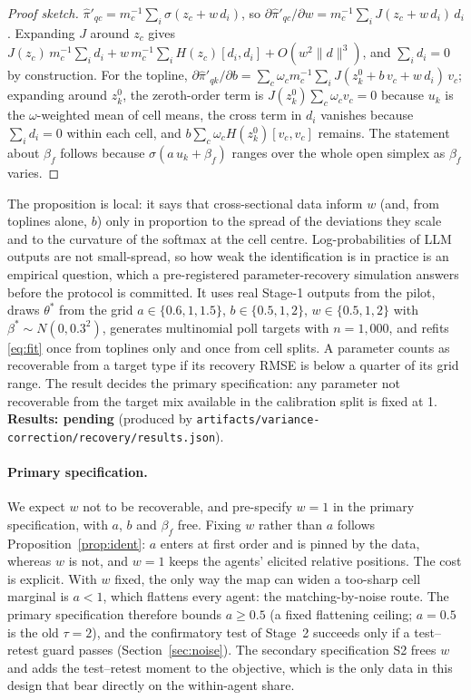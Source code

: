 \documentclass[11pt]{article}
\newcommand{\pending}[1]{\textbf{Results: pending} (produced by \nolinkurl{#1}).}
\begin{document}
\begin{proof}[Proof sketch]
$\hat\pi'_{qc}=m_c^{-1}\sum_i\sigma(z_c+w\,d_i)$, so $\partial\hat\pi'_{qc}/\partial w = m_c^{-1}\sum_i J(z_c+w\,d_i)\,d_i$. Expanding $J$ around $z_c$ gives $J(z_c)\,m_c^{-1}\sum_i d_i + w\,m_c^{-1}\sum_i H(z_c)[d_i,d_i]+O(w^2\lVert d\rVert^3)$, and $\sum_i d_i=0$ by construction. For the topline, $\partial\hat\pi'_{qk}/\partial b=\sum_c\omega_c m_c^{-1}\sum_i J(z^0_k+b\,v_c+w\,d_i)\,v_c$; expanding around $z^0_k$, the zeroth-order term is $J(z^0_k)\sum_c\omega_c v_c=0$ because $u_k$ is the $\omega$-weighted mean of cell means, the cross term in $d_i$ vanishes because $\sum_i d_i=0$ within each cell, and $b\sum_c\omega_c H(z^0_k)[v_c,v_c]$ remains. The statement about $\beta_f$ follows because $\sigma(a\,u_k+\beta_f)$ ranges over the whole open simplex as $\beta_f$ varies.
\end{proof}

The proposition is local: it says that cross-sectional data inform $w$ (and, from toplines alone, $b$) only in proportion to the spread of the deviations they scale and to the curvature of the softmax at the cell centre. Log-probabilities of LLM outputs are not small-spread, so how weak the identification is in practice is an empirical question, which a pre-registered parameter-recovery simulation answers before the protocol is committed. It uses real Stage-1 outputs from the pilot, draws $\theta^\ast$ from the grid $a\in\{0.6,1,1.5\}$, $b\in\{0.5,1,2\}$, $w\in\{0.5,1,2\}$ with $\beta^\ast\sim N(0,0.3^2)$, generates multinomial poll targets with $n=1{,}000$, and refits \eqref{eq:fit} once from toplines only and once from cell splits. A parameter counts as recoverable from a target type if its recovery RMSE is below a quarter of its grid range. The result decides the primary specification: any parameter not recoverable from the target mix available in the calibration split is fixed at 1. \pending{artifacts/variance-correction/recovery/results.json}

\paragraph{Primary specification.} We expect $w$ not to be recoverable, and pre-specify $w=1$ in the primary specification, with $a$, $b$ and $\beta_f$ free. Fixing $w$ rather than $a$ follows Proposition~\ref{prop:ident}: $a$ enters at first order and is pinned by the data, whereas $w$ is not, and $w=1$ keeps the agents' elicited relative positions. The cost is explicit. With $w$ fixed, the only way the map can widen a too-sharp cell marginal is $a<1$, which flattens every agent: the matching-by-noise route. The primary specification therefore bounds $a\ge 0.5$ (a fixed flattening ceiling; $a=0.5$ is the old $\tau=2$), and the confirmatory test of Stage~2 succeeds only if a test--retest guard passes (Section~\ref{sec:noise}). The secondary specification S2 frees $w$ and adds the test--retest moment to the objective, which is the only data in this design that bear directly on the within-agent share.
\end{document}
